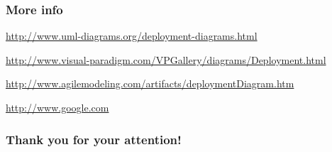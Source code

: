 \documentclass{beamer}
\begin{document}
\begin{frame}\frametitle{More info}

\begin{itemize}
{
\footnotesize 
\item
  \href{http://www.uml-diagrams.org/deployment-diagrams.html}{http://www.uml-diagrams.org/deployment-diagrams.html}
\item
  \href{http://www.visual-paradigm.com/VPGallery/diagrams/Deployment.html}{http://www.visual-paradigm.com/VPGallery/diagrams/Deployment.html}
\item
  \href{http://www.agilemodeling.com/artifacts/deploymentDiagram.htm}{http://www.agilemodeling.com/artifacts/deploymentDiagram.htm}
\item
  \href{http://www.google.com}{http://www.google.com}
}
\end{itemize}

\end{frame}

\begin{frame}\frametitle{Thank you for your attention!}

\end{frame}
\end{document}
